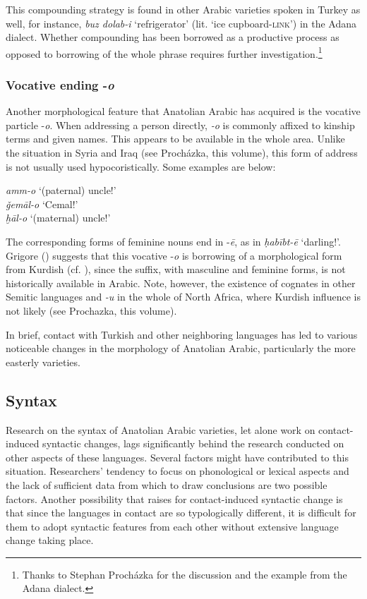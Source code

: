 \documentclass[output=paper]{langsci/langscibook}
\begin{document}
\noindent This compounding strategy is found in other Arabic varieties spoken in Turkey as well, for instance, \textit{buz dolab-i} `refrigerator' (lit. `ice cupboard-\textsc{link}') in the Adana dialect. Whether compounding has been borrowed as a productive process as opposed to borrowing of the whole phrase requires further investigation.\footnote{Thanks to Stephan Proch\'{a}zka for the discussion and the example from the Adana dialect.}



\subsubsection{Vocative ending -\textit{o}}
Another morphological feature that Anatolian Arabic has acquired is the vocative particle -\textit{o}. When addressing a person directly, \textit{-o} is commonly affixed to kinship terms and given names. This appears to be available in the whole area. Unlike the situation in Syria and Iraq (see Proch\'{a}zka, this volume), this form of address is not usually used hypocoristically. Some examples are below:

\ea
\noindent \textit{amm-o} `(paternal) uncle!'\\
\textit{ǧem\={a}l-o} `Cemal!'\\
\textit{ḫāl-o} `(maternal) uncle!'\\
\z

\noindent The corresponding forms of feminine nouns end in -\textit{\={e}}, as in \textit{ḥabībt-ē} `darling!'. Grigore (\citeyear[203]{Grigore2007book}) suggests that this vocative -\textit{o} is borrowing of a morphological form from Kurdish (cf. \citealt{HaigÖpengin2018}), since the suffix, with masculine and feminine forms, is not historically available in Arabic. Note, however, the existence of cognates in other Semitic languages and \textit{-u} in the whole of North Africa, where Kurdish influence is not likely (see Prochazka, this volume).

In brief, contact with Turkish and other neighboring languages has led to various noticeable changes in the morphology of Anatolian Arabic, particularly the more easterly varieties. 

\subsection{Syntax}
Research on the syntax of Anatolian Arabic varieties, let alone work on contact-induced syntactic changes, lags significantly behind the research conducted on other aspects of these languages. Several factors might have contributed to this situation. Researchers' tendency to focus on phonological or lexical aspects and the lack of sufficient data from which to draw conclusions  are two possible factors. Another possibility that \cite{Ingham2005} raises for contact-induced syntactic change is that since the languages in contact are so typologically different, it is difficult for them to adopt syntactic features from each other without extensive language change taking place. 
\end{document}
